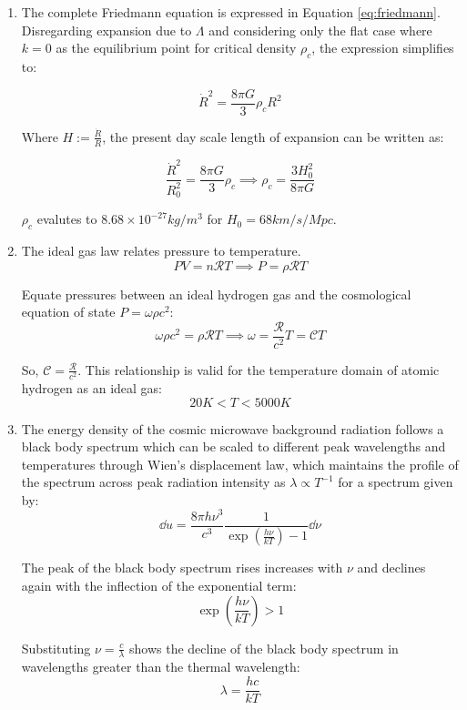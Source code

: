 \documentclass{paper}
\begin{document}
\begin{enumerate}
    \item %
      The complete Friedmann equation is expressed in Equation 
      \ref{eq:friedmann}.  Disregarding expansion due to \(\Lambda\) and 
      considering only the flat case where \(k=0\) as the equilibrium point 
      for critical density \(\rho_c\), the expression simplifies to:

      \[ \dot{R}^2 = \frac{8 \pi G}{3}\rho_c R^2 \]

      Where \( H:= \frac{\dot{R}}{R} \), the present day scale length of
      expansion can be written as:

      \[ 
      \frac{\dot{R}^2}{R_0^2} = \frac{8 \pi G}{3}\rho_c 
      \implies
      \rho_c = \frac{3 H_0^2}{8 \pi G}
      \]

      \(\rho_c\) evalutes to \(8.68\times10^{-27} kg/m^{3}\) 
      for \(H_0 = 68 km/s/Mpc\).

    \item %
      The ideal gas law relates pressure to temperature.
      \[ PV = n\mathcal{R}T \implies P = \rho\mathcal{R}T\] 

      Equate pressures between an ideal hydrogen gas and the cosmological
      equation of state \(P = \omega \rho c^2\):
      \[ 
      \omega \rho c^2 = \rho \mathcal{R} T 
      \implies 
      \omega = \frac{\mathcal{R}}{c^2}T = \mathcal{C}T
      \]

      So, \(\mathcal{C} = \frac{\mathcal{R}}{c^2} \). This relationship is 
      valid for the temperature domain of atomic hydrogen as an ideal gas: 
      \[ 20 K < T < 5000 K \]

    \item %
      The energy density of the cosmic microwave background radiation follows
      a black body spectrum which can be scaled to different peak wavelengths 
      and temperatures through Wien's displacement law, which maintains the 
      profile of the spectrum across peak radiation intensity as 
      \(\lambda \propto T^{-1}\) for a spectrum given by:
      \begin{equation}
        \dd{u} = \frac{8 \pi h \nu^3}{c^3} \frac{1}{
          \exp(\frac{h \nu}{kT}) - 1} \dd{\nu}
        \label{eq:spectrum}
      \end{equation}

      The peak of the black body spectrum rises increases with \(\nu\) and 
      declines again with the inflection of the exponential term:
      \[ \exp(\frac{h \nu}{k T}) > 1 \]

      Substituting \(\nu = \frac{c}{\lambda}\) shows the decline of the black 
      body spectrum in wavelengths greater than the thermal wavelength:
      \begin{equation}
        \lambda = \frac{h c}{k T}
        \label{eq:lambda}
      \end{equation}


\end{enumerate}
\end{document}
